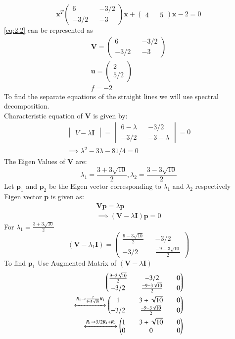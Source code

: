 \documentclass[journal,13pt,twocolumn]{IEEEtran}
\newcommand{\myvec}[1]{\ensuremath{\begin{pmatrix}#1\end{pmatrix}}}
\newcommand{\mydet}[1]{\ensuremath{\begin{vmatrix}#1\end{vmatrix}}}
\renewcommand{\vec}[1]{\mathbf{#1}}
\begin{document}
\begin{equation} \label{eq:2.7}
\vec{x}^T \myvec{6 && -3/2 \\ -3/2 && -3} \vec{x} + \myvec{4 && 5}\vec{x} -2 = 0
\end{equation}
\eqref{eq:2.2} can be represented as 
\begin{equation} \label{eq:2.8}
\begin{split}
\vec{V}=\myvec{6 && -3/2\\ -3/2 && -3}\\
\vec{u}=\myvec{2\\5/2}\\
f= -2
\end{split}
\end{equation}
To find the separate equations of the straight lines we will use spectral decomposition.\\
Characteristic equation of $\vec{V}$ is given by:
\begin{equation} \label{eq:2.9}
\begin{split}
\mydet{V-\lambda \vec{I}}=\mydet{6-\lambda && -3/2\\ -3/2 && -3-\lambda} = 0\\
\implies \lambda^2 - 3\lambda - 81/4 = 0
\end{split}
\end{equation}
The Eigen Values of $\vec{V}$ are:
\begin{equation} \label{eq:2.10}
\lambda_1 = \frac{3+3\sqrt{10}}{2}, \lambda_2 = \frac{3-3\sqrt{10}}{2}
\end{equation}
Let $\vec{p}_1$ and $\vec{p}_2$ be the Eigen vector corresponding to $\lambda_1$ and $\lambda_2$ respectively\\
Eigen vector $\vec{p}$ is given as:
\begin{equation} \label{eq:2.11}
\begin{split}
\vec{V}\vec{p} = \lambda\vec{p}\\
\implies (\vec{V} - \lambda \vec{I})\vec{p} = 0
\end{split}
\end{equation}
For $\lambda_1 = \frac{3+3\sqrt{10}}{2}$
\begin{equation}\label{eq:2.12}
(\vec{V} - \lambda_1 \vec{I}) = \myvec{\frac{9-3\sqrt{10}}{2} && -3/2\\ -3/2 && \frac{-9-3\sqrt{10}}{2}}
\end{equation}
To find $ \vec{p}_1 $ Use Augmented Matrix of $(\vec{V} - \lambda \vec{I})$
\begin{equation} \label{eq:2.13}
\begin{split}
 \myvec{\frac{9-3\sqrt{10}}{2} && -3/2 && 0\\ -3/2 && \frac{-9-3\sqrt{10}}{2} && 0}\\
\xleftrightarrow[]{R_1\rightarrow \frac{2}{9-3\sqrt{10}}R_1} 
\myvec{1 && 3+\sqrt{10} && 0\\ -3/2 && \frac{-9-3\sqrt{10}}{2} && 0}\\
\xleftrightarrow[]{R_1\rightarrow 3/2R_1+R_2} 
\myvec{1 && 3+\sqrt{10} && 0\\ 0 && 0 && 0} 
\end{split}
\end{equation}
\end{document}
